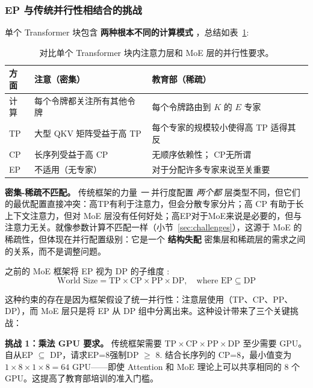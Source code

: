 \subsubsection{EP 与传统并行性相结合的挑战}\label{sec:combining-parallelism}

单个 Transformer 块包含 \textbf{两种根本不同的计算模式} \cite{Singh_2023}，总结如表~\ref{tab:dense-sparse-comparison}:

\begin{table}[ht]
\centering
\caption{对比单个 Transformer 块内注意力层和 MoE 层的并行性要求。}
\label{tab:dense-sparse-comparison}
\begin{tabular}{lp{}p{}}
\toprule
\textbf{方面} & \textbf{注意（密集）} & \textbf{教育部（稀疏）} \\
\midrule
计算 & 每个令牌都关注所有其他令牌 & 每个令牌路由到 $K$ 的 $E$ 专家 \\
TP & 大型 QKV 矩阵受益于高 TP & 每个专家的规模较小使得高 TP 适得其反 \\
CP & 长序列受益于高 CP & 无顺序依赖性； CP无所谓 \\
EP & 不适用（无专家） & 对于分配许多专家来说至关重要 \\
\bottomrule
\end{tabular}
\end{table}

\textbf{密集-稀疏不匹配。} 传统框架的力量 \emph{一} 并行度配置 \emph{两个都} 层类型不同，但它们的最优配置直接冲突：高TP有利于注意力，但会分散专家分片；高 CP 有助于长上下文注意力，但对 MoE 层没有任何好处；高EP对于MoE来说是必要的，但与注意力无关。就像参数计算不匹配一样（小节~\ref{sec:challenges}），这源于 MoE 的稀疏性，但体现在并行配置级别：它是一个 \textbf{结构失配} 密集层和稀疏层的需求之间的关系，而不是调整问题。

之前的 MoE 框架将 EP 视为 DP 的子维度 \cite{lepikhin2020gshard,fedus2022switchtransformersscalingtrillion}:
\[
\text{World Size} = \text{TP} \times \text{CP} \times \text{PP} \times \text{DP}, \quad \text{where } \text{EP} \subseteq \text{DP}
\]

这种约束的存在是因为框架假设了统一并行性：注意层使用（TP、CP、PP、DP），而 MoE 层只是将 EP 从 DP 组中分离出来。这种设计带来了三个关键挑战：

\textbf{挑战 1：乘法 GPU 要求。} 传统框架需要 $\text{TP} \times \text{CP} \times \text{PP} \times \text{DP}$ 至少需要 GPU。自从EP $\subseteq$ DP，请求EP=8强制DP $\geq$ 8. 结合长序列的 CP=8，最小值变为 $1 \times 8 \times 1 \times 8 = 64$ GPU——即使 Attention 和 MoE 理论上可以共享相同的 8 个 GPU。这提高了教育部培训的准入门槛。

